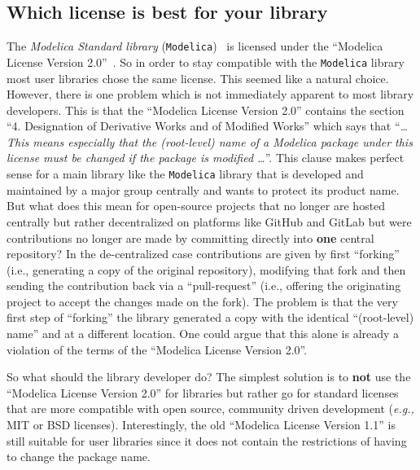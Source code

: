 \documentclass[11pt,a4paper,twocolumn]{article}
\begin{document}
\subsection{Which license is best for your library}
The \emph{Modelica Standard library}
(\texttt{Modelica})~\parencite{MSL} is licensed under the ``Modelica
License Version 2.0''~\parencite{MoLic2}. So in order to stay
compatible with the \texttt{Modelica} library most user libraries
chose the same license. This seemed like a natural choice. However,
there is one problem which is not immediately apparent to most library
developers. This is that the ``Modelica License Version 2.0'' contains
the section ``4. Designation of Derivative Works and of Modified
Works'' which says that ``\emph{\ldots This means especially that the
  (root-level) name of a Modelica package under this license must be
  changed if the package is modified \ldots}''.  This clause makes
perfect sense for a main library like the \texttt{Modelica} library
that is developed and maintained by a major group centrally and wants
to protect its product name.  But what does this mean for open-source
projects that no longer are hosted centrally but rather decentralized
on platforms like GitHub and GitLab but were contributions no longer
are made by committing directly into \textbf{one} central repository?
In the de-centralized case contributions are given by first
``forking'' (i.e., generating a copy of the original repository),
modifying that fork and then sending the contribution back via a
``pull-request'' (i.e., offering the originating project to accept the
changes made on the fork).  The problem is that the very first step of
``forking'' the library generated a copy with the identical
``(root-level) name'' and at a different location. One could argue
that this alone is already a violation of the terms of the ``Modelica
License Version 2.0''.

So what should the library developer do? The simplest solution is to
\textbf{not} use the ``Modelica License Version 2.0'' for libraries
but rather go for standard licenses~\parencite{lic} that are more
compatible with open source, community driven development ({\it e.g.,}
MIT or BSD licenses). Interestingly, the old ``Modelica License
Version 1.1'' is still suitable for user libraries since it does not
contain the restrictions of having to change the package name.
\end{document}
